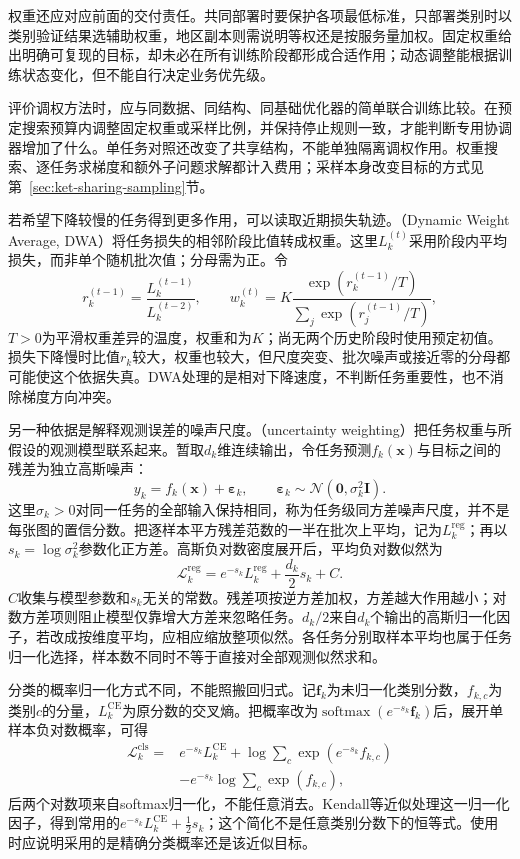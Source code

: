 权重还应对应前面的交付责任。共同部署时要保护各项最低标准，只部署类别时以类别验证结果选辅助权重，地区副本则需说明等权还是按服务量加权。固定权重给出明确可复现的目标，却未必在所有训练阶段都形成合适作用；动态调整能根据训练状态变化，但不能自行决定业务优先级。

评价调权方法时，应与同数据、同结构、同基础优化器的简单联合训练比较。在预定搜索预算内调整固定权重或采样比例，并保持停止规则一致，才能判断专用协调器增加了什么。单任务对照还改变了共享结构，不能单独隔离调权作用。权重搜索、逐任务求梯度和额外子问题求解都计入费用；采样本身改变目标的方式见第~\ref{sec:ket-sharing-sampling}节。

若希望下降较慢的任务得到更多作用，可以读取近期损失轨迹。（Dynamic Weight Average, DWA）将任务损失的相邻阶段比值转成权重。这里$L_k^{(t)}$采用阶段内平均损失，而非单个随机批次值；分母需为正。令
\[
  r_k^{(t-1)}=\frac{L_k^{(t-1)}}{L_k^{(t-2)}},
  \qquad
  w_k^{(t)}
  =K\frac{\exp(r_k^{(t-1)}/T)}
          {\sum_j\exp(r_j^{(t-1)}/T)},
\]
$T>0$为平滑权重差异的温度，权重和为$K$；尚无两个历史阶段时使用预定初值。损失下降慢时比值$r_k$较大，权重也较大，但尺度突变、批次噪声或接近零的分母都可能使这个依据失真。DWA处理的是相对下降速度，不判断任务重要性，也不消除梯度方向冲突。

另一种依据是解释观测误差的噪声尺度。（uncertainty weighting）把任务权重与所假设的观测模型联系起来。暂取$d_k$维连续输出，令任务预测$f_k(\bm x)$与目标之间的残差为独立高斯噪声：
\begin{equation}
  y_k=f_k(\bm x)+\bm\varepsilon_k,
  \qquad
  \bm\varepsilon_k\sim
  \mathcal N(\bm0,\sigma_k^2\bm I).
\end{equation}
这里$\sigma_k>0$对同一任务的全部输入保持相同，称为任务级同方差噪声尺度，并不是每张图的置信分数。把逐样本平方残差范数的一半在批次上平均，记为$L_k^{\mathrm{reg}}$；再以$s_k=\log\sigma_k^2$参数化正方差。高斯负对数密度展开后，平均负对数似然为
\begin{equation}
  \mathcal L_k^{\mathrm{reg}}
  =e^{-s_k}L_k^{\mathrm{reg}}
   +\frac{d_k}{2}s_k+C.
  \label{eq:ket-sharing-uncertainty-regression}
\end{equation}
$C$收集与模型参数和$s_k$无关的常数。残差项按逆方差加权，方差越大作用越小；对数方差项则阻止模型仅靠增大方差来忽略任务。$d_k/2$来自$d_k$个输出的高斯归一化因子，若改成按维度平均，应相应缩放整项似然。各任务分别取样本平均也属于任务归一化选择，样本数不同时不等于直接对全部观测似然求和。

分类的概率归一化方式不同，不能照搬回归式。记$\bm f_k$为未归一化类别分数，$f_{k,c}$为类别$c$的分量，$L_k^{\mathrm{CE}}$为原分数的交叉熵。把概率改为$\operatorname{softmax}(e^{-s_k}\bm f_k)$后，展开单样本负对数概率，可得
\begin{align}
  \mathcal L_k^{\mathrm{cls}}
  ={}&e^{-s_k}L_k^{\mathrm{CE}}
  +\log\sum_c\exp(e^{-s_k}f_{k,c})
  \nonumber\\
  &-e^{-s_k}\log\sum_c\exp(f_{k,c}),
  \label{eq:ket-sharing-uncertainty-classification}
\end{align}
后两个对数项来自softmax归一化，不能任意消去。Kendall等近似处理这一归一化因子，得到常用的$e^{-s_k}L_k^{\mathrm{CE}}+\tfrac12s_k$；这个简化不是任意类别分数下的恒等式。使用时应说明采用的是精确分类概率还是该近似目标。

